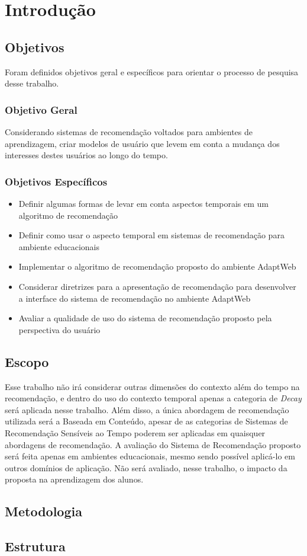 \chapter{Introdução}\label{introducao}

\section{Objetivos}

Foram definidos objetivos geral e específicos para orientar o processo de pesquisa desse trabalho.

\subsection{Objetivo Geral}

Considerando sistemas de recomendação voltados para ambientes de aprendizagem, criar modelos de usuário que levem em
conta a mudança dos interesses destes usuários ao longo do tempo.

\subsection{Objetivos Específicos}

\begin{itemize}
\item Definir algumas formas de levar em conta aspectos temporais em um algoritmo de recomendação
\item Definir como usar o aspecto temporal em sistemas de recomendação para ambiente educacionais
\item Implementar o algoritmo de recomendação proposto do ambiente AdaptWeb\textsuperscript{\textregistered}
\item Considerar diretrizes para a apresentação de recomendação para desenvolver a interface do sistema de recomendação
no ambiente AdaptWeb\textsuperscript{\textregistered}
\item Avaliar a qualidade de uso do sistema de recomendação proposto pela perspectiva do usuário
\end{itemize}

\section{Escopo}

Esse trabalho não irá considerar outras dimensões do contexto além do tempo na recomendação, e dentro do uso do contexto
temporal apenas a categoria de \textit{Decay} será aplicada nesse trabalho. Além disso, a única abordagem de recomendação
utilizada será a Baseada em Conteúdo, apesar de as categorias de Sistemas de Recomendação Sensíveis ao Tempo poderem ser
aplicadas em quaisquer abordagens de recomendação. A avaliação do Sistema de Recomendação proposto será feita apenas em ambientes educacionais, mesmo sendo
possível aplicá-lo em outros domínios de aplicação. Não será avaliado, nesse trabalho, o impacto da proposta na aprendizagem
dos alunos.

\section{Metodologia}

\section{Estrutura}



